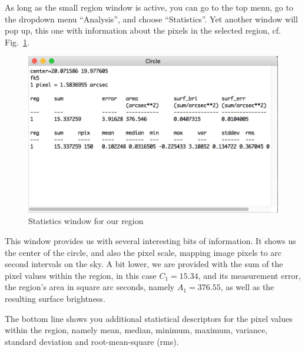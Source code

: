 \documentclass[twocolumn,apj]{openjournal}
\begin{document}
As long as the small region window is active, you can go to the top menu, go to the dropdown menu ``Analysis'', and choose ``Statistics''. Yet another window will pop up, this one with information about the pixels in the selected region, cf. Fig.~\ref{StatisticsWindow}.
\begin{figure}[htbp]
\begin{center}
\includegraphics[width=\linewidth]{statistics-window.jpg}
\caption{Statistics window for our region}
\label{StatisticsWindow}
\end{center}
\end{figure}
This window provides us with several interesting bits of information. It shows us the center of the circle, and also the pixel scale, mapping image pixels to arc second intervals on the sky. A bit lower, we are provided with the sum of the pixel values within the region, in this case $C_1=15.34$, and its measurement error, the region's area in square arc seconds, namely $A_1=376.55$, as well as the resulting surface brightness.

The bottom line shows you additional statistical descriptors for the pixel values within the region, namely mean, median, minimum, maximum, variance, standard deviation and root-mean-square (rms).
\end{document}
